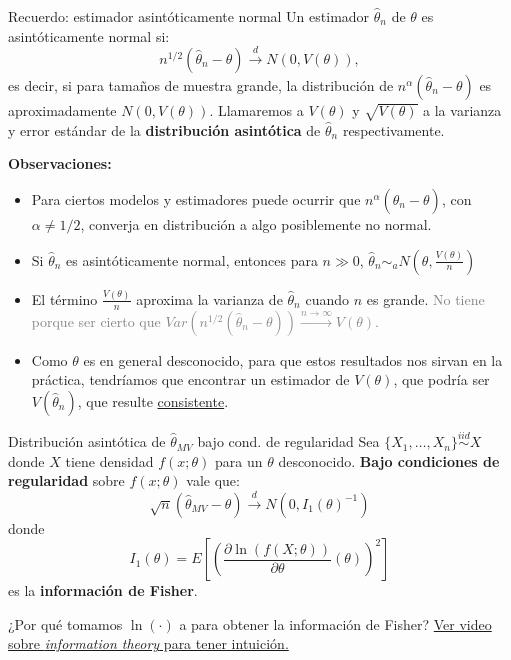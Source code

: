 \documentclass{beamer}
\theoremstyle{definition}
\newcommand{\cw}{\overset{d}{\rightarrow}}
\begin{document}
\begin{frame}{\color{rosee}Recuerdo: estimador asintóticamente normal}
\small
    Un estimador $\widehat{\theta}_{n}$ de $\theta$ es
    asintóticamente normal si: 
    $$
    n^{1/2}(\widehat{\theta}_{n}-\theta) \cw N(0, V(\theta)),
    $$
    es decir, si para tama\~nos de muestra grande, la distribuci\'on de
    $ n^{\alpha}(\widehat{\theta}_{n}-\theta) $ es aproximadamente
    $N(0, V(\theta))$. Llamaremos a $V(\theta)$ y $\sqrt{V(\theta)}$ a la varianza y error est\'andar de la \textbf{distribución asint\'otica}
    de $\widehat{\theta}_{n}$ respectivamente.
  
\textbf{ Observaciones:}
  \begin{itemize}
 \item  Para ciertos modelos y estimadores puede ocurrir que $n^{\alpha}(\widehat{\theta}_{n}-\theta)$, con $\alpha \neq 1/2$, converja en distribución a algo posiblemente no normal.
 \item Si $\widehat{\theta}_{n}$ es asintóticamente normal, entonces para $n\gg0$, $\widehat{\theta}_{n} \sim_a N\left(\theta, \frac{V(\theta)}{n} \right)$
\item El término $
    \frac{V(\theta)}{n} 
    $    aproxima la varianza de $\widehat{\theta}_{n}$ cuando $n$ es grande. \textcolor{gray}{ No tiene porque ser cierto que 
    $Var(n^{1/2}(\widehat{\theta}_{n}-\theta))\stackrel{n\to\infty}{\rightarrow} V(\theta)$.}
   \item Como $\theta$ es en general desconocido, para que estos resultados nos sirvan en la práctica, tendr\'iamos que encontrar un estimador de $V(\theta)$, que podr\'ia ser   $V(\widehat{\theta}_{n})$, que resulte \underline{consistente}.\medskip
  \end{itemize}

  
\end{frame}







\begin{frame}{\color{rosee}Distribuci\'on asint\'otica de $\widehat{\theta}_{MV}$ bajo cond. de regularidad}
\small
    Sea $\{X_{1},\dots,X_{n}\}\stackrel{iid}{\sim}X$ donde  $X$ tiene
    densidad $f(x;\theta)$ para un $\theta$ desconocido. \textbf{Bajo
    condiciones de regularidad} sobre $f(x;\theta)$ vale que:
    $$
    \sqrt{n}\left( \widehat{\theta}_{MV} - \theta\right) \cw N(0, I_{1}(\theta)^{-1}) 
    $$
    donde 
    $$
    I_{1}(\theta)=E\left[ \left(\frac{\partial \ln(f(X;\theta))}{\partial\theta}(\theta) \right)^{2} \right]
    $$
    es la \textbf{informaci\'on de Fisher}.

    \medskip

    ¿Por qué tomamos $\ln(\cdot)$ a  para obtener la información de Fisher?
    \href{https://www.youtube.com/watch?v=v68zYyaEmEA&ab_channel=3Blue1Brown}{Ver video sobre \textit{information theory} para tener intuición.}
\end{frame}
\end{document}
